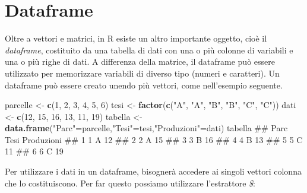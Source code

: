 \documentclass[a4paper,12pt,oneside]{book}
\newenvironment{Shaded}{\begin{snugshade}}{\end{snugshade}}
\newcommand{\KeywordTok}[1]{\textcolor[rgb]{0.13,0.29,0.53}{\textbf{#1}}}
\newcommand{\DecValTok}[1]{\textcolor[rgb]{0.00,0.00,0.81}{#1}}
\newcommand{\StringTok}[1]{\textcolor[rgb]{0.31,0.60,0.02}{#1}}
\newcommand{\OperatorTok}[1]{\textcolor[rgb]{0.81,0.36,0.00}{\textbf{#1}}}
\newcommand{\NormalTok}[1]{#1}
\theoremstyle{definition}
\theoremstyle{definition}
\theoremstyle{definition}
\theoremstyle{remark}
\begin{document}
\section*{Dataframe}\label{dataframe}

Oltre a vettori e matrici, in R esiste un altro importante oggetto, cioè
il \emph{dataframe}, costituito da una tabella di dati con una o più
colonne di variabili e una o più righe di dati. A differenza della
matrice, il dataframe può essere utilizzato per memorizzare variabili di
diverso tipo (numeri e caratteri). Un dataframe può essere creato unendo
più vettori, come nell'esempio seguente.

\begin{Shaded}
\begin{Highlighting}[]
\NormalTok{parcelle  <-}\StringTok{  }\KeywordTok{c}\NormalTok{(}\DecValTok{1}\NormalTok{, }\DecValTok{2}\NormalTok{, }\DecValTok{3}\NormalTok{, }\DecValTok{4}\NormalTok{, }\DecValTok{5}\NormalTok{, }\DecValTok{6}\NormalTok{)}
\NormalTok{tesi  <-}\StringTok{  }\KeywordTok{factor}\NormalTok{(}\KeywordTok{c}\NormalTok{(}\StringTok{"A"}\NormalTok{, }\StringTok{"A"}\NormalTok{, }\StringTok{"B"}\NormalTok{, }\StringTok{"B"}\NormalTok{, }\StringTok{"C"}\NormalTok{, }\StringTok{"C"}\NormalTok{))}
\NormalTok{dati  <-}\StringTok{  }\KeywordTok{c}\NormalTok{(}\DecValTok{12}\NormalTok{, }\DecValTok{15}\NormalTok{, }\DecValTok{16}\NormalTok{, }\DecValTok{13}\NormalTok{, }\DecValTok{11}\NormalTok{, }\DecValTok{19}\NormalTok{)}
\NormalTok{tabella  <-}\StringTok{  }\KeywordTok{data.frame}\NormalTok{(}\StringTok{"Parc"}\NormalTok{=parcelle,}\StringTok{"Tesi"}\NormalTok{=tesi,}\StringTok{"Produzioni"}\NormalTok{=dati)}
\NormalTok{tabella}
\NormalTok{##   Parc Tesi Produzioni}
\NormalTok{## 1    1    A         12}
\NormalTok{## 2    2    A         15}
\NormalTok{## 3    3    B         16}
\NormalTok{## 4    4    B         13}
\NormalTok{## 5    5    C         11}
\NormalTok{## 6    6    C         19}
\end{Highlighting}
\end{Shaded}

Per utilizzare i dati in un dataframe, bisognerà accedere ai singoli
vettori colonna che lo costituiscono. Per far questo possiamo utilizzare
l'estrattore \emph{\$}:

\begin{Shaded}
\end{Shaded}
\end{document}
